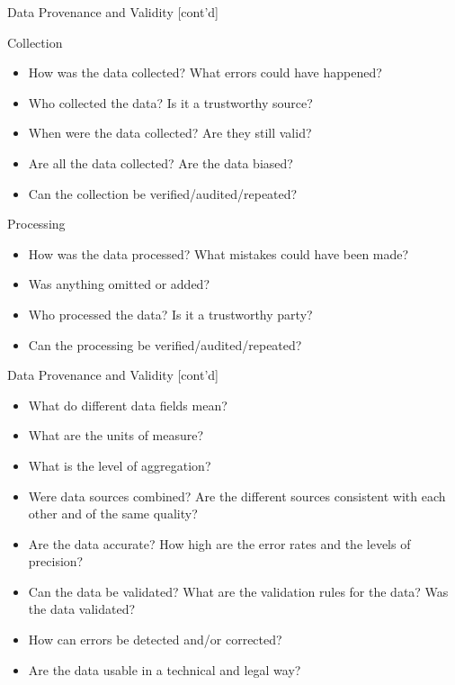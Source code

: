 \documentclass[ignorenonframetext,xcolor=x11names]{beamer}
\begin{document}
\begin{frame}[label=full]{Data Provenance and Validity \small [cont'd]}
\begin{block}{Collection}
\begin{itemize}
	\item How was the data collected? What errors could have happened?
	\item Who collected the data? Is it a trustworthy source?
	\item When were the data collected? Are they still valid?
	\item Are all the data collected? Are the data biased?
	\item Can the collection be verified/audited/repeated?
\end{itemize}
\end{block}

\begin{block}{Processing}
\begin{itemize}
	\item How was the data processed? What mistakes could have been made? 
	\item Was anything omitted or added?
	\item Who processed the data? Is it a trustworthy party?
	\item Can the processing be verified/audited/repeated?	
\end{itemize}
\end{block}
\end{frame}

\begin{frame}[label=full]{Data Provenance and Validity \small [cont'd]}
\begin{itemize}
	\item What do different data fields mean? 
	\item What are the units of measure? 
	\item What is the level of aggregation?
	\item Were data sources combined? Are the different sources consistent with each other and of the same quality?
	\item Are the data accurate? How high are the error rates and the levels of precision?
	\item Can the data be validated? What are the validation rules for the data? Was the data validated?
	\item How can errors be detected and/or corrected?
	\item Are the data usable in a technical and legal way?
\end{itemize}
\end{frame}
\end{document}
